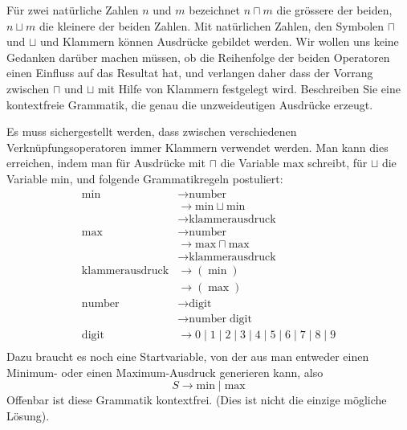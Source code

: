 Für zwei natürliche Zahlen $n$ und $m$ bezeichnet $n\sqcap m$ die
grössere der beiden, $n\sqcup m$ die kleinere der beiden Zahlen.
Mit natürlichen Zahlen, den Symbolen $\sqcap$ und $\sqcup$ und Klammern
können Ausdrücke gebildet werden.
Wir wollen uns keine Gedanken darüber machen müssen, ob die Reihenfolge
der beiden Operatoren einen Einfluss auf das Resultat hat, und
verlangen daher
dass der Vorrang zwischen $\sqcap$ und $\sqcup$ mit Hilfe
von Klammern festgelegt wird. Beschreiben Sie eine
kontextfreie Grammatik, die genau die unzweideutigen Ausdrücke
erzeugt.

\begin{loesung}
Es muss sichergestellt werden, dass zwischen verschiedenen
Verknüpfungsoperatoren immer Klammern verwendet werden. Man kann
dies erreichen, indem man für Ausdrücke mit $\sqcap$ die Variable
$\text{max}$ schreibt, für $\sqcup$ die Variable $\text{min}$, und
folgende Grammatikregeln postuliert:
\begin{align*}
\text{min}&\rightarrow \text{number}\\
&\rightarrow \text{min}\sqcup \text{min}\\
&\rightarrow\text{klammerausdruck}\\
\text{max}&\rightarrow \text{number}\\
&\rightarrow \text{max}\sqcap \text{max}\\
&\rightarrow\text{klammerausdruck}\\
\text{klammerausdruck}&\rightarrow (\;\text{min}\;)\\
&\rightarrow (\;\text{max}\;)\\
\text{number}&\rightarrow\text{digit}\\
&\rightarrow\text{number}\;\text{digit}\\
\text{digit}&\rightarrow 0
\;|\;1
\;|\;2
\;|\;3
\;|\;4
\;|\;5
\;|\;6
\;|\;7
\;|\;8
\;|\;9
\\
\end{align*}
Dazu braucht es noch eine Startvariable, von der aus man entweder einen
Minimum- oder einen Maximum-Ausdruck generieren kann, also
$$S\rightarrow \text{min}\;|\;\text{max}$$
Offenbar ist diese Grammatik kontextfrei.
(Dies ist nicht die einzige mögliche Lösung).
\end{loesung}
